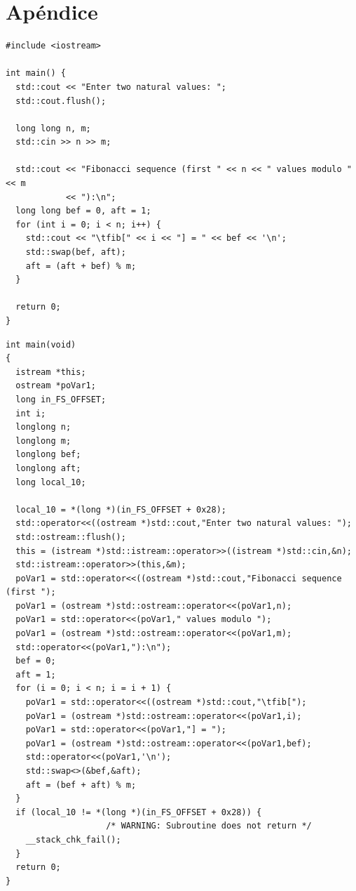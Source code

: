 \documentclass[runningheads]{llncs}
\begin{document}



\section*{Apéndice}

\begin{minipage}{0.95\linewidth}
\begin{verbatim}
#include <iostream>

int main() {
  std::cout << "Enter two natural values: ";
  std::cout.flush();

  long long n, m;
  std::cin >> n >> m;

  std::cout << "Fibonacci sequence (first " << n << " values modulo " << m
            << "):\n";
  long long bef = 0, aft = 1;
  for (int i = 0; i < n; i++) {
    std::cout << "\tfib[" << i << "] = " << bef << '\n';
    std::swap(bef, aft);
    aft = (aft + bef) % m;
  }

  return 0;
}
\end{verbatim}
\label{apendice:fibonacci}
\end{minipage}

\begin{minipage}{0.95\linewidth}
\begin{verbatim}
int main(void)
{
  istream *this;
  ostream *poVar1;
  long in_FS_OFFSET;
  int i;
  longlong n;
  longlong m;
  longlong bef;
  longlong aft;
  long local_10;
  
  local_10 = *(long *)(in_FS_OFFSET + 0x28);
  std::operator<<((ostream *)std::cout,"Enter two natural values: ");
  std::ostream::flush();
  this = (istream *)std::istream::operator>>((istream *)std::cin,&n);
  std::istream::operator>>(this,&m);
  poVar1 = std::operator<<((ostream *)std::cout,"Fibonacci sequence (first ");
  poVar1 = (ostream *)std::ostream::operator<<(poVar1,n);
  poVar1 = std::operator<<(poVar1," values modulo ");
  poVar1 = (ostream *)std::ostream::operator<<(poVar1,m);
  std::operator<<(poVar1,"):\n");
  bef = 0;
  aft = 1;
  for (i = 0; i < n; i = i + 1) {
    poVar1 = std::operator<<((ostream *)std::cout,"\tfib[");
    poVar1 = (ostream *)std::ostream::operator<<(poVar1,i);
    poVar1 = std::operator<<(poVar1,"] = ");
    poVar1 = (ostream *)std::ostream::operator<<(poVar1,bef);
    std::operator<<(poVar1,'\n');
    std::swap<>(&bef,&aft);
    aft = (bef + aft) % m;
  }
  if (local_10 != *(long *)(in_FS_OFFSET + 0x28)) {
                    /* WARNING: Subroutine does not return */
    __stack_chk_fail();
  }
  return 0;
}
\end{verbatim}
\label{apendice:main-decompilation-with-depuration-info}
\end{minipage}
\end{document}
